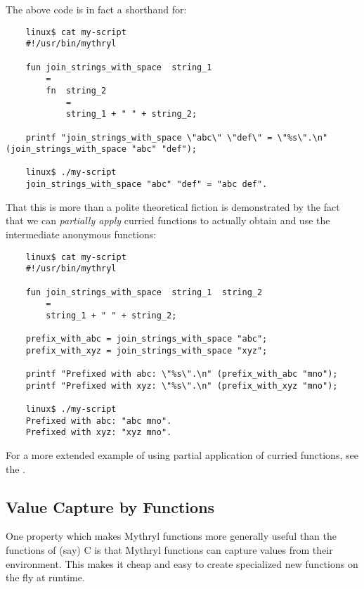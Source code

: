 The above code is in fact a shorthand for:

\begin{verbatim}
    linux$ cat my-script
    #!/usr/bin/mythryl

    fun join_strings_with_space  string_1
        =
        fn  string_2
            =
            string_1 + " " + string_2;

    printf "join_strings_with_space \"abc\" \"def\" = \"%s\".\n" (join_strings_with_space "abc" "def");

    linux$ ./my-script
    join_strings_with_space "abc" "def" = "abc def".
\end{verbatim}

That this is more than a polite theoretical fiction is 
demonstrated by the fact that we can {\it partially apply} 
curried functions to actually obtain and use the intermediate 
anonymous functions:

\begin{verbatim}
    linux$ cat my-script
    #!/usr/bin/mythryl

    fun join_strings_with_space  string_1  string_2
        =
        string_1 + " " + string_2;

    prefix_with_abc = join_strings_with_space "abc";
    prefix_with_xyz = join_strings_with_space "xyz";

    printf "Prefixed with abc: \"%s\".\n" (prefix_with_abc "mno");
    printf "Prefixed with xyz: \"%s\".\n" (prefix_with_xyz "mno");

    linux$ ./my-script
    Prefixed with abc: "abc mno".
    Prefixed with xyz: "xyz mno".
\end{verbatim}

For a more extended example of using partial application of 
curried functions, see the 
.


\cutend*


\subsection{Value Capture by Functions}
\label{section:ref:functions:value-capture-by-functions}

One property which makes Mythryl functions more generally useful than the 
functions of (say) C is that Mythryl functions can capture values from 
their environment.  This makes it cheap and easy to create specialized 
new functions on the fly at runtime.

